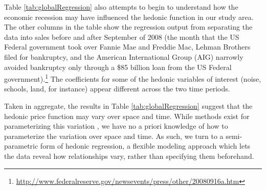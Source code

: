 \documentclass{article}\usepackage{graphicx, color}
\begin{document}
Table \ref{tab:globalRegression} also attempts to begin to understand how the economic recession may have influenced the hedonic function in our study area. The other columns in the table show the regression output from separating the data into sales before and after September of 2008 (the month that the US Federal government took over Fannie Mae and Freddie Mac, Lehman Brothers filed for bankruptcy, and the American International Group (AIG) narrowly avoided bankruptcy only through a \$85 billion loan from the US Federal government).\footnote{\url{http://www.federalreserve.gov/newsevents/press/other/20080916a.htm}} The coefficients for some of the hedonic variables of interest (noise, schools, land, for instance) appear different across the two time periods.

Taken in aggregate, the results in Table \ref{tab:globalRegression} suggest that the hedonic price function may vary over space and time. While methods exist for parameterizing this variation \citep[such as spatial expansion as suggested by][]{Casetti1972}, we have no a priori knowledge of how to parameterize the variation over space and time. As such, we turn to a semi-parametric form of hedonic regression, a flexible modeling approach which lets the data reveal how relationships vary, rather than specifying them beforehand.
\end{document}
